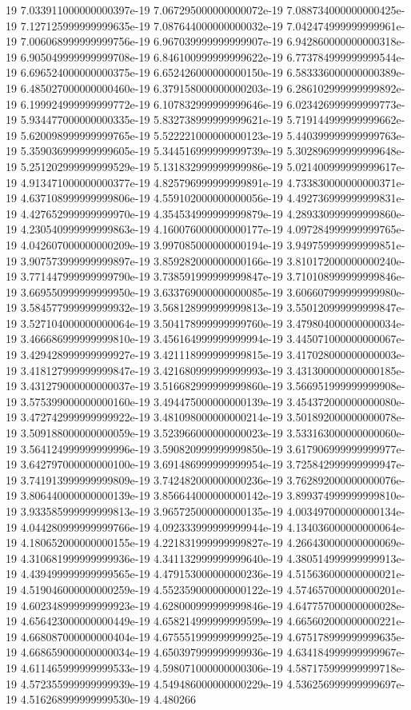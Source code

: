 19	7.033911000000000397e-19	7.067295000000000072e-19	7.088734000000000425e-19	7.127125999999999635e-19	7.087644000000000032e-19	7.042474999999999961e-19	7.006068999999999756e-19	6.967039999999999907e-19	6.942860000000000318e-19	6.905049999999999708e-19	6.846100999999999622e-19	6.773784999999999544e-19	6.696524000000000375e-19	6.652426000000000150e-19	6.583336000000000389e-19	6.485027000000000460e-19	6.379158000000000203e-19	6.286102999999999892e-19	6.199924999999999772e-19	6.107832999999999646e-19	6.023426999999999773e-19	5.934477000000000335e-19	5.832738999999999621e-19	5.719144999999999662e-19	5.620098999999999765e-19	5.522221000000000123e-19	5.440399999999999763e-19	5.359036999999999605e-19	5.344516999999999739e-19	5.302896999999999648e-19	5.251202999999999529e-19	5.131832999999999986e-19	5.021400999999999617e-19	4.913471000000000377e-19	4.825796999999999891e-19	4.733830000000000371e-19	4.637108999999999806e-19	4.559102000000000056e-19	4.492736999999999831e-19	4.427652999999999970e-19	4.354534999999999879e-19	4.289330999999999860e-19	4.230540999999999863e-19	4.160076000000000177e-19	4.097284999999999765e-19	4.042607000000000209e-19	3.997085000000000194e-19	3.949759999999999851e-19	3.907573999999999897e-19	3.859282000000000166e-19	3.810172000000000240e-19	3.771447999999999790e-19	3.738591999999999847e-19	3.710108999999999846e-19	3.669550999999999950e-19	3.633769000000000085e-19	3.606607999999999980e-19	3.584577999999999932e-19	3.568128999999999813e-19	3.550120999999999847e-19	3.527104000000000064e-19	3.504178999999999760e-19	3.479804000000000034e-19	3.466686999999999810e-19	3.456164999999999994e-19	3.445071000000000067e-19	3.429428999999999927e-19	3.421118999999999815e-19	3.417028000000000003e-19	3.418127999999999847e-19	3.421680999999999993e-19	3.431300000000000185e-19	3.431279000000000037e-19	3.516682999999999860e-19	3.566951999999999908e-19	3.575399000000000160e-19	3.494475000000000139e-19	3.454372000000000080e-19	3.472742999999999922e-19	3.481098000000000214e-19	3.501892000000000078e-19	3.509188000000000059e-19	3.523966000000000023e-19	3.533163000000000060e-19	3.564124999999999996e-19	3.590820999999999850e-19	3.617906999999999977e-19	3.642797000000000100e-19	3.691486999999999954e-19	3.725842999999999947e-19	3.741913999999999809e-19	3.742482000000000236e-19	3.762892000000000076e-19	3.806440000000000139e-19	3.856644000000000142e-19	3.899374999999999810e-19	3.933585999999999813e-19	3.965725000000000135e-19	4.003497000000000134e-19	4.044280999999999766e-19	4.092333999999999944e-19	4.134036000000000064e-19	4.180652000000000155e-19	4.221831999999999827e-19	4.266430000000000069e-19	4.310681999999999936e-19	4.341132999999999640e-19	4.380514999999999913e-19	4.439499999999999565e-19	4.479153000000000236e-19	4.515636000000000021e-19	4.519046000000000259e-19	4.552359000000000122e-19	4.574657000000000201e-19	4.602348999999999923e-19	4.628000999999999846e-19	4.647757000000000028e-19	4.656423000000000449e-19	4.658214999999999599e-19	4.665602000000000221e-19	4.668087000000000404e-19	4.675551999999999925e-19	4.675178999999999635e-19	4.668659000000000034e-19	4.650397999999999936e-19	4.634184999999999967e-19	4.611465999999999533e-19	4.598071000000000306e-19	4.587175999999999718e-19	4.572355999999999939e-19	4.549486000000000229e-19	4.536256999999999697e-19	4.516268999999999530e-19	4.480266